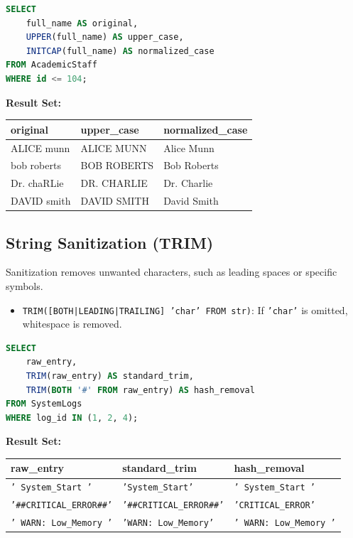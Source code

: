 \documentclass[12pt,a4paper]{article}
\begin{document}
\begin{lstlisting}[language=SQL]
SELECT 
    full_name AS original, 
    UPPER(full_name) AS upper_case, 
    INITCAP(full_name) AS normalized_case
FROM AcademicStaff
WHERE id <= 104;
\end{lstlisting}

\textbf{Result Set:}
\begin{table}[H]
\centering
\begin{tabular}{@{}lll@{}}
\toprule
\textbf{original} & \textbf{upper\_case} & \textbf{normalized\_case} \\ \midrule
ALICE munn & ALICE MUNN & Alice Munn \\
bob roberts & BOB ROBERTS & Bob Roberts \\
Dr. chaRLie & DR. CHARLIE & Dr. Charlie \\
DAVID smith & DAVID SMITH & David Smith \\ \bottomrule
\end{tabular}
\end{table}

\subsection{String Sanitization (TRIM)}
Sanitization removes unwanted characters, such as leading spaces or specific symbols.
\begin{itemize}
    \item \texttt{TRIM([BOTH|LEADING|TRAILING] \texttt{'char'} FROM str)}: If \texttt{'char'} is omitted, whitespace is removed.
\end{itemize}

\begin{lstlisting}[language=SQL]
SELECT 
    raw_entry, 
    TRIM(raw_entry) AS standard_trim, 
    TRIM(BOTH '#' FROM raw_entry) AS hash_removal
FROM SystemLogs 
WHERE log_id IN (1, 2, 4);
\end{lstlisting}

\textbf{Result Set:}
\begin{table}[H]
\centering
\begin{tabular}{@{}lll@{}}
\toprule
\textbf{raw\_entry} & \textbf{standard\_trim} & \textbf{hash\_removal} \\ \midrule
\texttt{'   System\_Start   '} & \texttt{'System\_Start'} & \texttt{'   System\_Start   '} \\
\texttt{'\#\#CRITICAL\_ERROR\#\#'} & \texttt{'\#\#CRITICAL\_ERROR\#\#'} & \texttt{'CRITICAL\_ERROR'} \\
\texttt{'   WARN: Low\_Memory '} & \texttt{'WARN: Low\_Memory'} & \texttt{'   WARN: Low\_Memory '} \\ \bottomrule
\end{tabular}
\end{table}
\end{document}
